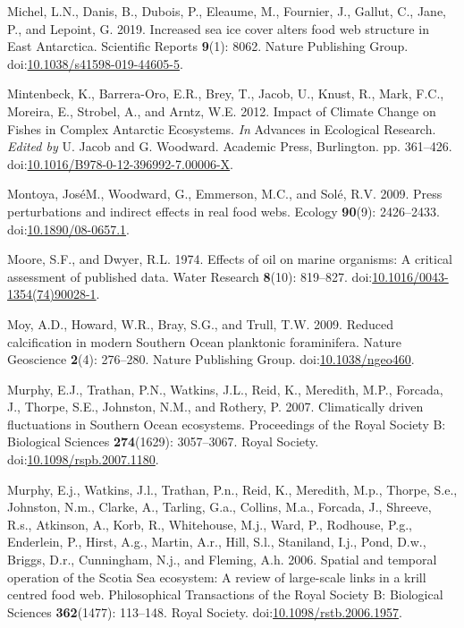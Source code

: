 \documentclass[
]{article}
\newlength{\cslhangindent}
\newenvironment{CSLReferences}[2] %
 {\begin{list}{}{%
  \setlength{\itemindent}{0pt}
  \setlength{\leftmargin}{0pt}
  \setlength{\parsep}{0pt}
  \ifodd #1
   \setlength{\leftmargin}{\cslhangindent}
   \setlength{\itemindent}{-1\cslhangindent}
  \fi
  \setlength{\itemsep}{#2\baselineskip}}}
 {\end{list}}
\begin{document}
\begin{CSLReferences}{1}{0}
Michel, L.N., Danis, B., Dubois, P., Eleaume, M., Fournier, J., Gallut,
C., Jane, P., and Lepoint, G. 2019. Increased sea ice cover alters food
web structure in {East Antarctica}. Scientific Reports \textbf{9}(1):
8062. Nature Publishing Group.
doi:\href{https://doi.org/10.1038/s41598-019-44605-5}{10.1038/s41598-019-44605-5}.

Mintenbeck, K., Barrera-Oro, E.R., Brey, T., Jacob, U., Knust, R., Mark,
F.C., Moreira, E., Strobel, A., and Arntz, W.E. 2012. Impact of {Climate
Change} on {Fishes} in {Complex Antarctic Ecosystems}. \emph{In}
Advances in {Ecological Research}. \emph{Edited by} U. Jacob and G.
Woodward. Academic Press, Burlington. pp. 361--426.
doi:\href{https://doi.org/10.1016/B978-0-12-396992-7.00006-X}{10.1016/B978-0-12-396992-7.00006-X}.

Montoya, JoséM., Woodward, G., Emmerson, M.C., and Solé, R.V. 2009.
Press perturbations and indirect effects in real food webs. Ecology
\textbf{90}(9): 2426--2433.
doi:\href{https://doi.org/10.1890/08-0657.1}{10.1890/08-0657.1}.

Moore, S.F., and Dwyer, R.L. 1974. Effects of oil on marine organisms:
{A} critical assessment of published data. Water Research
\textbf{8}(10): 819--827.
doi:\href{https://doi.org/10.1016/0043-1354(74)90028-1}{10.1016/0043-1354(74)90028-1}.

Moy, A.D., Howard, W.R., Bray, S.G., and Trull, T.W. 2009. Reduced
calcification in modern {Southern Ocean} planktonic foraminifera. Nature
Geoscience \textbf{2}(4): 276--280. Nature Publishing Group.
doi:\href{https://doi.org/10.1038/ngeo460}{10.1038/ngeo460}.

Murphy, E.J., Trathan, P.N., Watkins, J.L., Reid, K., Meredith, M.P.,
Forcada, J., Thorpe, S.E., Johnston, N.M., and Rothery, P. 2007.
Climatically driven fluctuations in {Southern Ocean} ecosystems.
Proceedings of the Royal Society B: Biological Sciences
\textbf{274}(1629): 3057--3067. Royal Society.
doi:\href{https://doi.org/10.1098/rspb.2007.1180}{10.1098/rspb.2007.1180}.

Murphy, E.j., Watkins, J.l., Trathan, P.n., Reid, K., Meredith, M.p.,
Thorpe, S.e., Johnston, N.m., Clarke, A., Tarling, G.a., Collins, M.a.,
Forcada, J., Shreeve, R.s., Atkinson, A., Korb, R., Whitehouse, M.j.,
Ward, P., Rodhouse, P.g., Enderlein, P., Hirst, A.g., Martin, A.r.,
Hill, S.l., Staniland, I.j., Pond, D.w., Briggs, D.r., Cunningham, N.j.,
and Fleming, A.h. 2006. Spatial and temporal operation of the {Scotia
Sea} ecosystem: A review of large-scale links in a krill centred food
web. Philosophical Transactions of the Royal Society B: Biological
Sciences \textbf{362}(1477): 113--148. Royal Society.
doi:\href{https://doi.org/10.1098/rstb.2006.1957}{10.1098/rstb.2006.1957}.


\end{CSLReferences}
\end{document}
